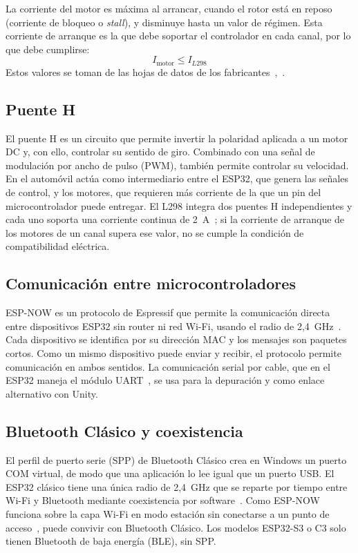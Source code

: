 \documentclass[journal]{IEEEtran}
\begin{document}
La corriente del motor es máxima al arrancar, cuando el rotor está en reposo (corriente de bloqueo o \emph{stall}), y disminuye hasta un valor de régimen. Esta corriente de arranque es la que debe soportar el controlador en cada canal, por lo que debe cumplirse:
\begin{equation}
I_{\text{motor}} \leq I_{L298}
\end{equation}
Estos valores se toman de las hojas de datos de los fabricantes~\cite{tt},~\cite{l298}.

\subsection{Puente H}
El puente H es un circuito que permite invertir la polaridad aplicada a un motor DC y, con ello, controlar su sentido de giro. Combinado con una señal de modulación por ancho de pulso (PWM), también permite controlar su velocidad. En el automóvil actúa como intermediario entre el ESP32, que genera las señales de control, y los motores, que requieren más corriente de la que un pin del microcontrolador puede entregar. El L298 integra dos puentes H independientes y cada uno soporta una corriente continua de 2~A~\cite{l298}; si la corriente de arranque de los motores de un canal supera ese valor, no se cumple la condición de compatibilidad eléctrica.

\subsection{Comunicación entre microcontroladores}
ESP-NOW es un protocolo de Espressif que permite la comunicación directa entre dispositivos ESP32 sin router ni red Wi-Fi, usando el radio de 2,4~GHz~\cite{espnow}. Cada dispositivo se identifica por su dirección MAC y los mensajes son paquetes cortos. Como un mismo dispositivo puede enviar y recibir, el protocolo permite comunicación en ambos sentidos. La comunicación serial por cable, que en el ESP32 maneja el módulo UART~\cite{uart}, se usa para la depuración y como enlace alternativo con Unity.

\subsection{Bluetooth Clásico y coexistencia}
El perfil de puerto serie (SPP) de Bluetooth Clásico crea en Windows un puerto COM virtual, de modo que una aplicación lo lee igual que un puerto USB. El ESP32 clásico tiene una única radio de 2,4~GHz que se reparte por tiempo entre Wi-Fi y Bluetooth mediante coexistencia por software~\cite{coexist}. Como ESP-NOW funciona sobre la capa Wi-Fi en modo estación sin conectarse a un punto de acceso~\cite{espnow}, puede convivir con Bluetooth Clásico. Los modelos ESP32-S3 o C3 solo tienen Bluetooth de baja energía (BLE), sin SPP.
\end{document}
